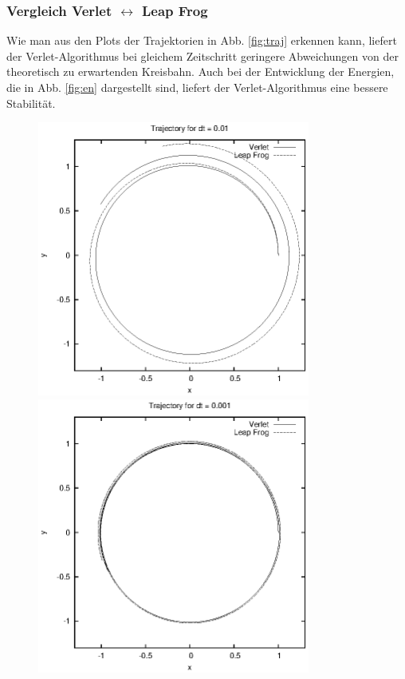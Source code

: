\documentclass[a4paper,11pt]{scrartcl}
\begin{document}
\subsubsection*{Vergleich Verlet $\leftrightarrow$ Leap Frog} %
\label{ssub:vergleich_verlet_leftrightarrow_leap_frog}
Wie man aus den Plots der Trajektorien in Abb. \ref{fig:traj} erkennen kann, liefert der Verlet-Algorithmus bei gleichem Zeitschritt geringere Abweichungen von der theoretisch zu erwartenden Kreisbahn. Auch bei der Entwicklung der Energien, die in Abb. \ref{fig:en} dargestellt sind, liefert der Verlet-Algorithmus eine bessere Stabilität.

\begin{figure}[tbp]
\centering
\includegraphics[width=0.8\textwidth]{../trajectories_0_01}\\ \includegraphics[width=0.8\textwidth]{../trajectories_0_001}\\

\end{figure}
\end{document}
